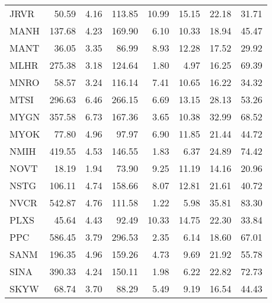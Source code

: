 \begin{table}
\begin{tabular}{lrrrrrrr}
  JRVR &        50.59 &          4.16 &          113.85 &            10.99 &         15.15 &      22.18 &        31.71 \\
  MANH &       137.68 &          4.23 &          169.90 &             6.10 &         10.33 &      18.94 &        45.47 \\
  MANT &        36.05 &          3.35 &           86.99 &             8.93 &         12.28 &      17.52 &        29.92 \\
  MLHR &       275.38 &          3.18 &          124.64 &             1.80 &          4.97 &      16.25 &        69.39 \\
  MNRO &        58.57 &          3.24 &          116.14 &             7.41 &         10.65 &      16.22 &        34.32 \\
  MTSI &       296.63 &          6.46 &          266.15 &             6.69 &         13.15 &      28.13 &        53.26 \\
  MYGN &       357.58 &          6.73 &          167.36 &             3.65 &         10.38 &      32.99 &        68.52 \\
  MYOK &        77.80 &          4.96 &           97.97 &             6.90 &         11.85 &      21.44 &        44.72 \\
  NMIH &       419.55 &          4.53 &          146.55 &             1.83 &          6.37 &      24.89 &        74.42 \\
  NOVT &        18.19 &          1.94 &           73.90 &             9.25 &         11.19 &      14.16 &        20.96 \\
  NSTG &       106.11 &          4.74 &          158.66 &             8.07 &         12.81 &      21.61 &        40.72 \\
  NVCR &       542.87 &          4.76 &          111.58 &             1.22 &          5.98 &      35.81 &        83.30 \\
  PLXS &        45.64 &          4.43 &           92.49 &            10.33 &         14.75 &      22.30 &        33.84 \\
   PPC &       586.45 &          3.79 &          296.53 &             2.35 &          6.14 &      18.60 &        67.01 \\
  SANM &       196.35 &          4.96 &          159.26 &             4.73 &          9.69 &      21.92 &        55.78 \\
  SINA &       390.33 &          4.24 &          150.11 &             1.98 &          6.22 &      22.82 &        72.73 \\
  SKYW &        68.74 &          3.70 &           88.29 &             5.49 &          9.19 &      16.54 &        44.43 \\
\bottomrule
\end{tabular}
\end{table}

